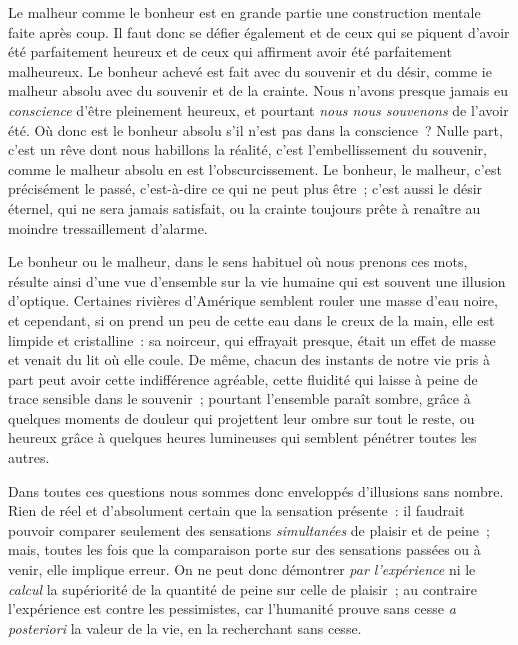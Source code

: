 \documentclass[french,twoside]{book} %
\begin{document}
Le malheur comme le bonheur est en grande partie une construction mentale faite après coup. Il faut donc se défier également et de ceux qui se piquent d’avoir été parfaitement heureux et de ceux qui affirment avoir été parfaitement malheureux. Le bonheur achevé est fait avec du souvenir et du désir, comme ie malheur absolu avec du souvenir et de la crainte. Nous n’avons presque jamais eu \emph{conscience} d’être pleinement heureux, et pourtant \emph{nous nous souvenons} de l’avoir été. Où donc est le bonheur absolu s’il n’est pas dans la conscience ? Nulle part, c’est un rêve dont nous habillons la réalité, c’est l’embellissement du souvenir, comme le malheur absolu en est l’obscurcissement. Le bonheur, le malheur, c’est précisément le passé, c’est-à-dire ce qui ne peut plus être ; c’est aussi le désir éternel, qui ne sera jamais satisfait, ou la crainte toujours prête à renaître au moindre tressaillement d’alarme.\par
Le bonheur ou le malheur, dans le sens habituel où nous prenons ces mots, résulte ainsi d’une vue d’ensemble sur la vie humaine qui est souvent une illusion d’optique. Certaines rivières d’Amérique semblent rouler une masse d’eau noire, et cependant, si on prend un peu de cette eau dans le creux de la main, elle est limpide et cristalline : sa noirceur, qui effrayait presque, était un effet de masse et venait du lit où elle coule. De même, chacun des instants de notre vie pris à part peut avoir cette indifférence agréable, cette fluidité qui laisse à peine de trace sensible dans le souvenir ; pourtant l’ensemble paraît sombre, grâce à quelques moments de douleur qui projettent leur ombre sur tout le reste, ou heureux grâce à quelques heures lumineuses qui semblent pénétrer toutes les autres.\par
Dans toutes ces questions nous sommes donc enveloppés d’illusions sans nombre. Rien de réel et d’absolument certain que la sensation présente : il faudrait pouvoir comparer seulement des sensations \emph{simultanées} de plaisir et de peine ; mais, toutes les fois que la comparaison porte sur des sensations passées ou à venir, elle implique erreur. On ne peut donc démontrer \emph{par l’expérience} ni le \emph{calcul} la supériorité de la quantité de peine sur celle de plaisir ; au contraire l’expérience est contre les pessimistes, car l’humanité prouve sans cesse \emph{a posteriori} la valeur de la vie, en la recherchant sans cesse.\par
\end{document}
